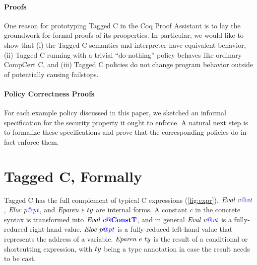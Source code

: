 \documentclass{llncs}
\begin{document}
\paragraph*{Proofs}
One reason for prototyping Tagged C in the Coq Proof Assistant is to lay the groundwork
for formal proofs of its prooperties.  In particular, we would like to show that
(i) the Tagged C semantics and interpreter have equivalent behavior; (ii) Tagged C running
with a trivial ``do-nothing'' policy behaves like ordinary CompCert C, and (iii) Tagged C policies
do not change program behavior outside of potentially causing failstops.

\paragraph*{Policy Correctness Proofs}
For each example policy discussed in this paper, we sketched an informal specification for the
security property it ought to enforce. A natural next step is to formalize these specifications
and prove that the corresponding policies do in fact enforce them.




\appendix


\section{Tagged C, Formally}

Tagged C has the full complement of typical C expressions (\cref{fig:expr}). \(\mathit{Eval} ~ v{\color{blue} @}\mathit{\color{blue} vt}\),
\(\mathit{Eloc} ~ p{\color{blue} @}\mathit{\color{blue} pt}\), and \(\mathit{Eparen} ~ e ~ ty\) are internal forms.
A constant \(c\) in the concrete syntax is transformed into \(\mathit{Eval} ~ c{\color{blue} @}\color{blue} \mathbf{ConstT}\),
and in general \(\mathit{Eval} ~ v{\color{blue} @}\mathit{\color{blue} vt}\) is a fully-reduced right-hand value. \(\mathit{Eloc} ~ p{\color{blue} @}\mathit{\color{blue} pt}\)
is a fully-reduced left-hand value that represents the address of a variable.
\(\mathit{Eparen} ~ e ~ ty\) is the result of a conditional or shortcutting
expression, with \(ty\) being a type annotation in case the result needs to
be cast.
\end{document}
